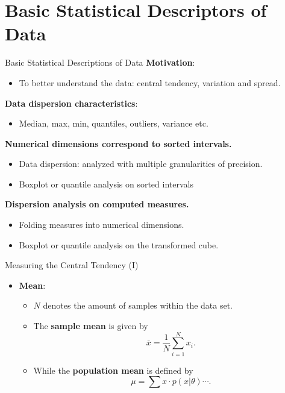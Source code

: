 \section{Basic Statistical Descriptors of Data}

\begin{frame}{Basic Statistical Descriptions of Data}
  \textbf{Motivation}:
  \begin{itemize}
  \item To better understand the data: central tendency, variation and spread.
  \end{itemize}

  \textbf{Data dispersion characteristics}:
  \begin{itemize}
  \item Median, max, min, quantiles, outliers, variance etc.
  \end{itemize}

  \textbf{Numerical dimensions correspond to sorted intervals.}\\
  \begin{itemize}
  \item Data dispersion: analyzed with multiple granularities of precision.
  \item Boxplot or quantile analysis on sorted intervals
  \end{itemize}

  \textbf{Dispersion analysis on computed measures.}\\
  \begin{itemize}
  \item Folding measures into numerical dimensions.
  \item Boxplot or quantile analysis on the transformed cube.
  \end{itemize}
\end{frame}

\begin{frame}{Measuring the Central Tendency (I)}
  \begin{itemize}
  \item \textbf{Mean}:
    \begin{itemize}
    \item $N$ denotes the amount of samples within the data set.
    \item The \textbf{sample mean} is given by\\
      \begin{equation*}
        \bar{x} = \frac{1}{N} \sum_{i=1}^{N} x_i.
      \end{equation*}
    \item While the \textbf{population mean} is defined by
      \begin{equation*}
        \mu = \sum x \cdot p(x | \theta) \cdots.
      \end{equation*}
    \end{itemize}
  \end{itemize}
\end{frame}


